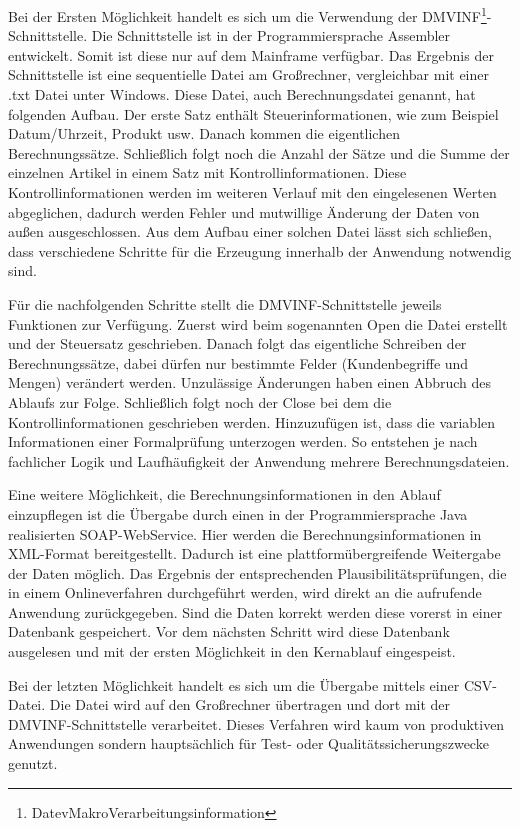 Bei der Ersten Möglichkeit handelt es sich um die Verwendung der DMVINF\footnote{DatevMakroVerarbeitungsinformation}-Schnittstelle.
Die Schnittstelle ist in der Programmiersprache Assembler entwickelt.
Somit ist diese nur auf dem Mainframe verfügbar.
Das Ergebnis der Schnittstelle ist eine sequentielle Datei am Großrechner, vergleichbar mit einer .txt Datei unter Windows.
Diese Datei, auch Berechnungsdatei genannt, hat folgenden Aufbau.
Der erste Satz enthält Steuerinformationen, wie zum Beispiel Datum/Uhrzeit, Produkt usw.
Danach kommen die eigentlichen Berechnungssätze.
Schließlich folgt noch die Anzahl der Sätze und die Summe der einzelnen Artikel in einem Satz mit Kontrollinformationen.
Diese Kontrollinformationen werden im weiteren Verlauf mit den eingelesenen Werten abgeglichen, dadurch werden Fehler und mutwillige Änderung der Daten von außen ausgeschlossen.
Aus dem Aufbau einer solchen Datei lässt sich schließen, dass verschiedene Schritte für die Erzeugung innerhalb der Anwendung notwendig sind.

Für die nachfolgenden Schritte stellt die DMVINF-Schnittstelle jeweils Funktionen zur Verfügung.
Zuerst wird beim sogenannten \glqq Open\grqq{} die Datei erstellt und der Steuersatz geschrieben.
Danach folgt das eigentliche Schreiben der Berechnungssätze, dabei dürfen nur bestimmte Felder (Kundenbegriffe und Mengen) verändert werden.
Unzulässige Änderungen haben einen Abbruch des Ablaufs zur Folge.
Schließlich folgt noch der \glqq Close\grqq{} bei dem die Kontrollinformationen geschrieben werden.
Hinzuzufügen ist, dass die variablen Informationen einer Formalprüfung unterzogen werden.
So entstehen je nach fachlicher Logik und Laufhäufigkeit der Anwendung mehrere Berechnungsdateien.

Eine weitere Möglichkeit, die Berechnungsinformationen in den Ablauf einzupflegen ist die Übergabe durch einen in der Programmiersprache Java realisierten SOAP-WebService.
Hier werden die Berechnungsinformationen in XML-Format bereitgestellt.
Dadurch ist eine plattformübergreifende Weitergabe der Daten möglich.
Das Ergebnis der entsprechenden Plausibilitätsprüfungen, die in einem Onlineverfahren durchgeführt werden, wird direkt an die aufrufende Anwendung zurückgegeben.
Sind die Daten korrekt werden diese vorerst in einer Datenbank gespeichert.
Vor dem nächsten Schritt wird diese Datenbank ausgelesen und mit der ersten Möglichkeit in den Kernablauf eingespeist.

Bei der letzten Möglichkeit handelt es sich um die Übergabe mittels einer CSV-Datei.
Die Datei wird auf den Großrechner übertragen und dort mit der DMVINF-Schnittstelle verarbeitet.
Dieses Verfahren wird kaum von produktiven Anwendungen sondern hauptsächlich für Test- oder Qualitätssicherungszwecke genutzt.

